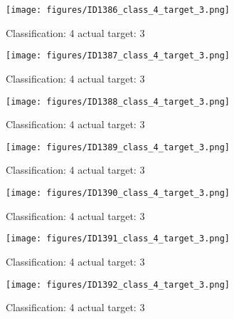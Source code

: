 \begin{figure}[h!]
\begin{center}
\texttt{[image: figures/ID1386\_class\_4\_target\_3.png]}
\end{center}
\caption{ Classification: 4 actual target: 3}
\label{fig:ID1386_class_4_target_3}
\end{figure}
\begin{figure}[h!]
\begin{center}
\texttt{[image: figures/ID1387\_class\_4\_target\_3.png]}
\end{center}
\caption{ Classification: 4 actual target: 3}
\label{fig:ID1387_class_4_target_3}
\end{figure}
\begin{figure}[h!]
\begin{center}
\texttt{[image: figures/ID1388\_class\_4\_target\_3.png]}
\end{center}
\caption{ Classification: 4 actual target: 3}
\label{fig:ID1388_class_4_target_3}
\end{figure}
\begin{figure}[h!]
\begin{center}
\texttt{[image: figures/ID1389\_class\_4\_target\_3.png]}
\end{center}
\caption{ Classification: 4 actual target: 3}
\label{fig:ID1389_class_4_target_3}
\end{figure}
\begin{figure}[h!]
\begin{center}
\texttt{[image: figures/ID1390\_class\_4\_target\_3.png]}
\end{center}
\caption{ Classification: 4 actual target: 3}
\label{fig:ID1390_class_4_target_3}
\end{figure}
\begin{figure}[h!]
\begin{center}
\texttt{[image: figures/ID1391\_class\_4\_target\_3.png]}
\end{center}
\caption{ Classification: 4 actual target: 3}
\label{fig:ID1391_class_4_target_3}
\end{figure}
\begin{figure}[h!]
\begin{center}
\texttt{[image: figures/ID1392\_class\_4\_target\_3.png]}
\end{center}
\caption{ Classification: 4 actual target: 3}
\label{fig:ID1392_class_4_target_3}
\end{figure}
